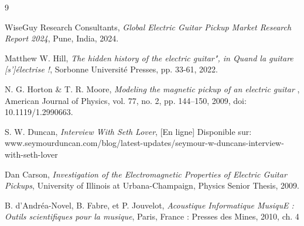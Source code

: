 \documentclass[a4paper,11pt]{article}
\begin{document}
\begin{thebibliography}{9}

WiseGuy Research Consultants, \textit{Global Electric Guitar Pickup Market Research Report 2024}, Pune, India, 2024.

Matthew W. Hill, \textit{The hidden history of the electric guitar", in Quand la guitare [s']électrise !}, Sorbonne Université Presses, pp. 33-61, 2022.

N. G. Horton & T. R. Moore, \textit{Modeling the magnetic pickup of an electric guitar }, American Journal of Physics, vol. 77, no. 2, pp. 144–150, 2009, doi: 10.1119/1.2990663.

S. W. Duncan, \textit{Interview With Seth Lover}, [En ligne] Disponible sur: www.seymourduncan.com/blog/latest-updates/seymour-w-duncans-interview-with-seth-lover

Dan Carson, \textit{Investigation of the Electromagnetic Properties of Electric Guitar Pickups}, University of Illinois at Urbana-Champaign, Physics Senior Thesis, 2009.

B. d’Andréa-Novel, B. Fabre, et P. Jouvelot, \textit{Acoustique Informatique MusiquE : Outils scientifiques pour la musique}, Paris, France : Presses des Mines, 2010, ch. 4

\end{thebibliography}
\end{document}
